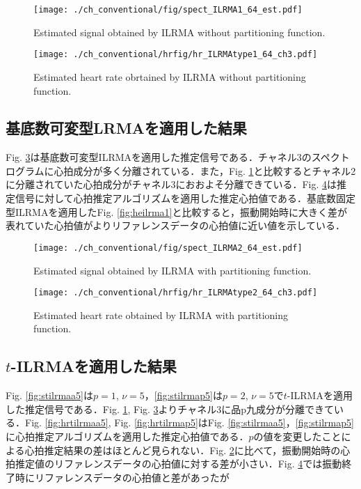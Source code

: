 \begin{figure}[tb]
\centering
\texttt{[image: ./ch\_conventional/fig/spect\_ILRMA1\_64\_est.pdf]}
\caption{Estimated signal obtained by ILRMA without partitioning function.}
\label{fig:silrma1}
\end{figure}

\begin{figure}[tb]
\centering
\texttt{[image: ./ch\_conventional/hrfig/hr\_ILRMAtype1\_64\_ch3.pdf]}
\caption{Estimated heart rate obrtained by ILRMA without partitioning function.}
\label{fig:hrilrma1}
\end{figure}

\subsection{基底数可変型LRMAを適用した結果}
\label{sec:conv:resultilrma2}
Fig. \ref{fig:silrma2}は基底数可変型ILRMAを適用した推定信号である．チャネル3のスペクトログラムに心拍成分が多く分離されている．また，Fig. \ref{fig:silrma1}と比較するとチャネル2に分離されていた心拍成分がチャネル3におおよそ分離できている．Fig. \ref{fig:hrilrma2}は推定信号に対して心拍推定アルゴリズムを適用した推定心拍値である．基底数固定型ILRMAを適用したFig. \ref{fig:heilrma1}と比較すると，振動開始時に大きく差が表れていた心拍値がよりリファレンスデータの心拍値に近い値を示している．

\begin{figure}[tb]
\centering
\texttt{[image: ./ch\_conventional/fig/spect\_ILRMA2\_64\_est.pdf]}
\caption{Estimated signal obtained by ILRMA with partitioning function.}
\label{fig:silrma2}
\end{figure}

\begin{figure}[tb]
\centering
\texttt{[image: ./ch\_conventional/hrfig/hr\_ILRMAtype2\_64\_ch3.pdf]}
\caption{Estimated heart rate obtained by ILRMA with partitioning function.}
\label{fig:hrilrma2}
\end{figure}

\subsection{$t$-ILRMAを適用した結果}
\label{sec:conv:resulttilrma}
Fig. \ref{fig:stilrmaa5}は$p=1$, $\nu = 5$，\ref{fig:stilrmap5}は$p=2$, $\nu = 5$で$t$-ILRMAを適用した推定信号である．Fig. \ref{fig:silrma1}, Fig. \ref{fig:silrma2}よりチャネル3に品p九成分が分離できている．Fig. \ref{fig:hrtilrmaa5}, Fig. \ref{fig:hrtilrmap5}はFig. \ref{fig:stilrmaa5}，\ref{fig:stilrmap5}に心拍推定アルゴリズムを適用した推定心拍値である．$p$の値を変更したことによる心拍推定結果の差はほとんど見られない．Fig. \ref{fig:hrilrma1}に比べて，振動開始時の心拍推定値のリファレンスデータの心拍値に対する差が小さい．Fig. \ref{fig:hrilrma2}では振動終了時にリファレンスデータの心拍値と差があったが

